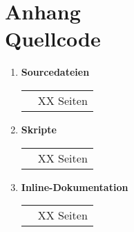 \addtocounter{chapter}{1}
\chapter*{Anhang \thechapter\\[1.2cm] Quellcode}
\label{Quellcode}

\begin{center}
  \begin{minipage}[c]{8cm}
    \begin{enumerate}
    \item \textbf{Sourcedateien}\\
      \begin{tabular}{p{4cm}r}
        & XX Seiten\\
      \end{tabular}
    \item \textbf{Skripte}\\
      \begin{tabular}{p{4cm}r}
        & XX Seiten\\
      \end{tabular}
      \item \textbf{Inline-Dokumentation}\\
      \begin{tabular}{p{4cm}r}
        & XX Seiten\\
      \end{tabular}
    \end{enumerate}
  \end{minipage}
\end{center}
\clearpage
\lhead{}
\ 
\cleardoublepage